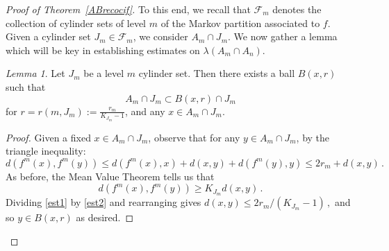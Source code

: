 \documentclass[11pt,reqno]{amsart}
\newcommand{\0}{\mathbf{0}}
\newtheorem{lemma}{Lemma}
\theoremstyle{remark}
\numberwithin{equation}{section}
\newtheorem{lemma}[theorem]{Lemma}
\theoremstyle{remark}
\numberwithin{equation}{section}
\begin{document}
\begin{proof}[Proof of Theorem~\ref{ABrecocif}]
 To this end, we recall that $\mathcal{F}_m$ denotes the collection of cylinder sets of level $m$ of the Markov partition associated to $f$. Given a cylinder set $J_m \in \mathcal{F}_m$, we consider $A_m \cap J_m$.
  We now gather a lemma which will be key in establishing estimates on $\lambda(A_m \cap A_n)$.
    \begin{lemma}\label{boundball}
       Let $J_m$ be a level $m$ cylinder set. Then there exists a ball $B(x,r)$ such that  $$A_m \cap J_m \subset B(x,r) \cap J_m$$ for $r=r(m,J_m):= \frac{r_m}{K_{J_m}-1}$, and any $x \in A_m \cap J_m$.
    \end{lemma} 
    \begin{proof}
        Given a fixed $x \in  A_m \cap J_m$, observe that for any $ y \in A_m \cap J_m$, by the triangle inequality:
       \begin{equation}\label{est1}
        d(f^m(x),f^m(y)) \leq d(f^m(x),x)+ d(x,y)+d(f^m(y),y) \leq 2r_m + d(x,y) \, .
        \end{equation}
        As before, the Mean Value Theorem tells us that
        \begin{equation}\label{est2}
        d(f^m(x),f^m(y)) \geq K_{J_m}d(x,y) \, .
        \end{equation}
       Dividing \eqref{est1} by \eqref{est2} and rearranging gives
        $
    d(x,y) \leq 2r_m/(K_{J_m}-1) \, ,
        $
        and so $y \in B(x,r)$ as desired.
       

\end{proof}
\end{proof}
\end{document}
